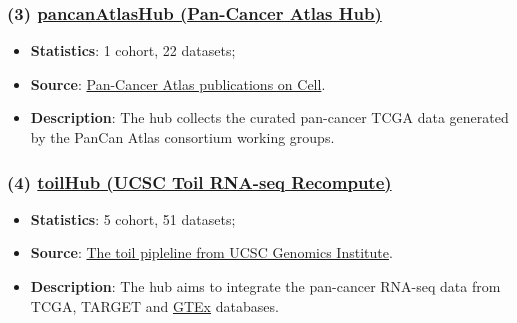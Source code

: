 \documentclass[
]{book}
\providecommand{\tightlist}{%
  \setlength{\itemsep}{0pt}\setlength{\parskip}{0pt}}
\begin{document}
\subsubsection*{\texorpdfstring{(3) \href{https://xenabrowser.net/datapages/?host=https\%3A\%2F\%2Fpancanatlas.xenahubs.net&removeHub=https\%3A\%2F\%2Fxena.treehouse.gi.ucsc.edu\%3A443}{pancanAtlasHub (Pan-Cancer Atlas Hub)}}{(3) pancanAtlasHub (Pan-Cancer Atlas Hub)}}\label{pancanatlashub-pan-cancer-atlas-hub}

\begin{itemize}
\tightlist
\item
  \textbf{Statistics}: 1 cohort, 22 datasets;
\item
  \textbf{Source}: \href{http://www.cell.com/pb-assets/consortium/PanCancerAtlas/PanCani3/index.html}{Pan-Cancer Atlas publications on Cell}.
\item
  \textbf{Description}: The hub collects the curated pan-cancer TCGA data generated by the PanCan Atlas consortium working groups.
\end{itemize}

\subsubsection*{\texorpdfstring{(4) \href{https://xenabrowser.net/datapages/?host=https\%3A\%2F\%2Ftoil.xenahubs.net&removeHub=https\%3A\%2F\%2Fxena.treehouse.gi.ucsc.edu\%3A443}{toilHub (UCSC Toil RNA-seq Recompute)}}{(4) toilHub (UCSC Toil RNA-seq Recompute)}}\label{toilhub-ucsc-toil-rna-seq-recompute}

\begin{itemize}
\tightlist
\item
  \textbf{Statistics}: 5 cohort, 51 datasets;
\item
  \textbf{Source}: \href{https://www.nature.com/articles/nbt.3772}{The toil pipleline from UCSC Genomics Institute}.
\item
  \textbf{Description}: The hub aims to integrate the pan-cancer RNA-seq data from TCGA, TARGET and \href{https://gtexportal.org/home/}{GTEx} databases.
\end{itemize}
\end{document}
